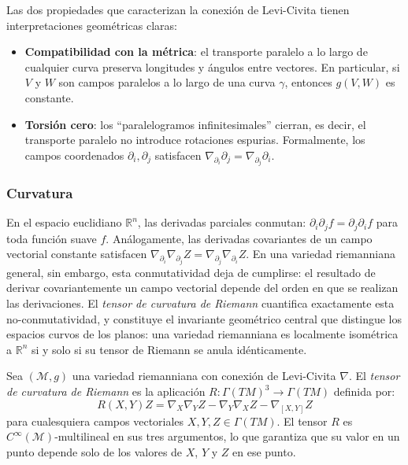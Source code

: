 \begin{remark}\label{rem:interpretacion_levi_civita}
Las dos propiedades que caracterizan la conexión de Levi-Civita tienen interpretaciones geométricas claras:
\begin{itemize}
	\item \textbf{Compatibilidad con la métrica}: el transporte paralelo a lo largo de cualquier curva preserva longitudes y ángulos entre vectores. En particular, si $V$ y $W$ son campos paralelos a lo largo de una curva $\gamma$, entonces $g(V,W)$ es constante.
	\item \textbf{Torsión cero}: los ``paralelogramos infinitesimales'' cierran, es decir, el transporte paralelo no introduce rotaciones espurias. Formalmente, los campos coordenados $\partial_i, \partial_j$ satisfacen $\nabla_{\partial_i}\partial_j = \nabla_{\partial_j}\partial_i$.
\end{itemize}
\end{remark}

\subsubsection{Curvatura}\label{subsec:curvatura_riemanniana}

En el espacio euclidiano $\mathbb{R}^n$, las derivadas parciales conmutan: $\partial_i \partial_j f = \partial_j \partial_i f$ para toda función suave $f$. Análogamente, las derivadas covariantes de un campo vectorial constante satisfacen $\nabla_{\partial_i} \nabla_{\partial_j} Z = \nabla_{\partial_j} \nabla_{\partial_i} Z$. En una variedad riemanniana general, sin embargo, esta conmutatividad deja de cumplirse: el resultado de derivar covariantemente un campo vectorial depende del orden en que se realizan las derivaciones. El \textit{tensor de curvatura de Riemann} cuantifica exactamente esta no-conmutatividad, y constituye el invariante geométrico central que distingue los espacios curvos de los planos: una variedad riemanniana es localmente isométrica a $\mathbb{R}^n$ si y solo si su tensor de Riemann se anula idénticamente.

\begin{definition}\label{def:tensor_riemann}
Sea $(\mathcal{M}, g)$ una variedad riemanniana con conexión de Levi-Civita $\nabla$. El \textit{tensor de curvatura de Riemann} es la aplicación $R\colon \Gamma(TM)^3 \to \Gamma(TM)$ definida por:
\[
R(X,Y)Z = \nabla_X \nabla_Y Z - \nabla_Y \nabla_X Z - \nabla_{[X,Y]} Z
\]
para cualesquiera campos vectoriales $X, Y, Z \in \Gamma(TM)$. El tensor $R$ es $C^\infty(\mathcal{M})$-multilineal en sus tres argumentos, lo que garantiza que su valor en un punto depende solo de los valores de $X$, $Y$ y $Z$ en ese punto.
\end{definition}

